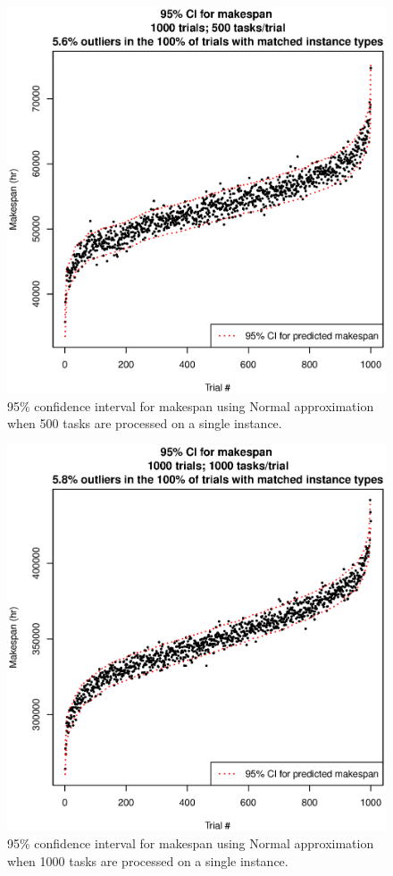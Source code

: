 \documentclass[12pt]{report}
\begin{document}
\begin{figure}
\includegraphics[width=1\textwidth]{validate-stochastic-runtimes-1000-trials-500-tasks.eps}
\caption{95\% confidence interval for makespan using Normal approximation when 500 tasks are processed on a single instance.}
\label{fig:validate-stochastic-runtimes-1000-trials-500-tasks}
\end{figure}

\begin{figure}
\includegraphics[width=1\textwidth]{validate-stochastic-runtimes-1000-trials-1000-tasks.eps}
\caption{95\% confidence interval for makespan using Normal approximation when 1000 tasks are processed on a single instance.}
\label{fig:validate-stochastic-runtimes-1000-trials-1000-tasks}
\end{figure}
\end{document}
